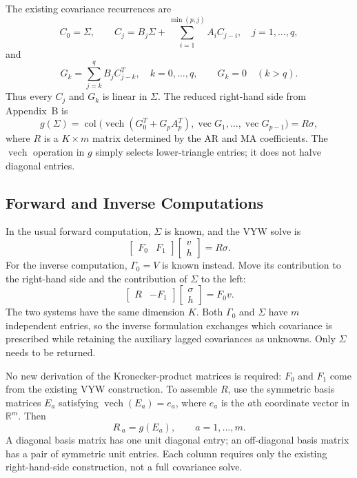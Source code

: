 \documentclass[11pt,a4paper]{article}
\begin{document}
The existing covariance recurrences are
$$
C_0=\Sigma,\qquad
C_j=B_j\Sigma+\sum_{i=1}^{\min(p,j)}A_iC_{j-i},
\quad j=1,\ldots,q,
$$
and
$$
G_k=\sum_{j=k}^{q}B_jC_{j-k}^T,\quad k=0,\ldots,q,
\qquad G_k=0\quad(k>q).
$$
Thus every $C_j$ and $G_k$ is linear in $\Sigma$. The reduced right-hand side
from Appendix~B is
$$
g(\Sigma)=\operatorname{col}\bigl(
  \operatorname{vech}(G_0^T+G_pA_p^T),
  \operatorname{vec}G_1,\ldots,\operatorname{vec}G_{p-1}\bigr)
=R\sigma,
$$
where $R$ is a $K\times m$ matrix determined by the AR and MA coefficients.
The $\operatorname{vech}$ operation in $g$ simply selects lower-triangle entries;
it does not halve diagonal entries.

\newpage
\subsection*{Forward and Inverse Computations}

In the usual forward computation, $\Sigma$ is known, and the VYW solve is
$$
\boxed{
\begin{bmatrix}F_0&F_1\end{bmatrix}
\begin{bmatrix}v\\h\end{bmatrix}=R\sigma.
}
$$
For the inverse computation, $\Gamma_0=V$ is known instead. Move its contribution
to the right-hand side and the contribution of $\Sigma$ to the left:
$$
\boxed{
\begin{bmatrix}R&-F_1\end{bmatrix}
\begin{bmatrix}\sigma\\h\end{bmatrix}=F_0v.
}
$$
The two systems have the same dimension $K$. Both $\Gamma_0$ and $\Sigma$ have
$m$ independent entries, so the inverse formulation exchanges which covariance
is prescribed while retaining the auxiliary lagged covariances as unknowns.
Only $\Sigma$ needs to be returned.

No new derivation of the Kronecker-product matrices is required: $F_0$ and $F_1$
come from the existing VYW construction. To assemble $R$, use the symmetric
basis matrices $E_a$ satisfying $\operatorname{vech}(E_a)=e_a$, where $e_a$ is
the $a$th coordinate vector in $\mathbb{R}^m$. Then
$$
R_{\cdot a}=g(E_a),\qquad a=1,\ldots,m.
$$
A diagonal basis matrix has one unit diagonal entry; an off-diagonal basis
matrix has a pair of symmetric unit entries. Each column requires only the
existing right-hand-side construction, not a full covariance solve.
\end{document}
